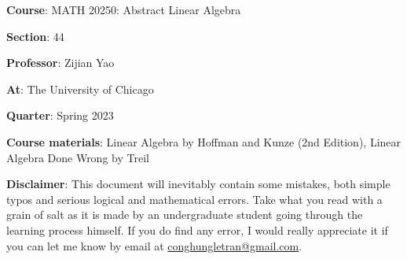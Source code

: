 \textbf{Course}: MATH 20250: Abstract Linear Algebra

\textbf{Section}: 44

\textbf{Professor}: Zijian Yao

\textbf{At}: The University of Chicago

\textbf{Quarter}: Spring 2023

\textbf{Course materials}: Linear Algebra by Hoffman and Kunze (2nd Edition), Linear Algebra Done Wrong by Treil

\vspace{1cm}
\textbf{Disclaimer}: This document will inevitably contain some mistakes, both simple typos and serious logical and mathematical errors. Take what you read with a grain of salt as it is made by an undergraduate student going through the learning process himself. If you do find any error, I would really appreciate it if you can let me know by email at \href{mailto:conghungletran@gmail.com}{conghungletran@gmail.com}.